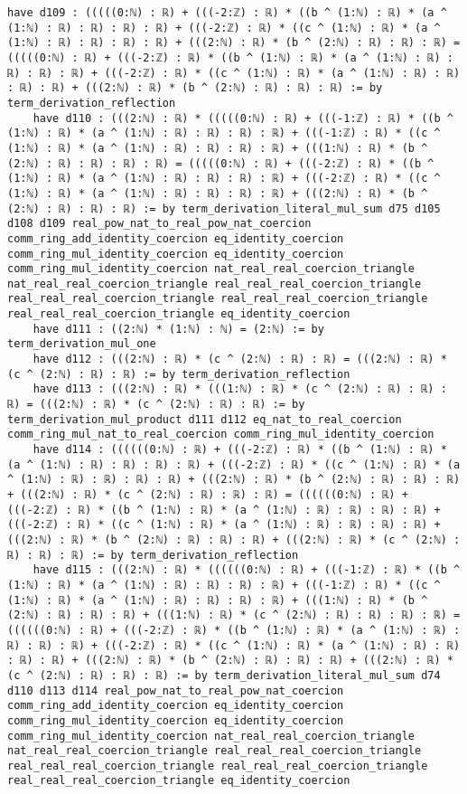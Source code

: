 \documentclass{article}
\begin{document}
\begin{tcolorbox}[colback=white!10, width=\linewidth]
\begin{lstlisting}[language=Lean4]
    have d109 : (((((0:ℕ) : ℝ) + (((-2:ℤ) : ℝ) * ((b ^ (1:ℕ) : ℝ) * (a ^ (1:ℕ) : ℝ) : ℝ) : ℝ) : ℝ) + (((-2:ℤ) : ℝ) * ((c ^ (1:ℕ) : ℝ) * (a ^ (1:ℕ) : ℝ) : ℝ) : ℝ) : ℝ) + (((2:ℕ) : ℝ) * (b ^ (2:ℕ) : ℝ) : ℝ) : ℝ) = (((((0:ℕ) : ℝ) + (((-2:ℤ) : ℝ) * ((b ^ (1:ℕ) : ℝ) * (a ^ (1:ℕ) : ℝ) : ℝ) : ℝ) : ℝ) + (((-2:ℤ) : ℝ) * ((c ^ (1:ℕ) : ℝ) * (a ^ (1:ℕ) : ℝ) : ℝ) : ℝ) : ℝ) + (((2:ℕ) : ℝ) * (b ^ (2:ℕ) : ℝ) : ℝ) : ℝ) := by term_derivation_reflection
    have d110 : (((2:ℕ) : ℝ) * (((((0:ℕ) : ℝ) + (((-1:ℤ) : ℝ) * ((b ^ (1:ℕ) : ℝ) * (a ^ (1:ℕ) : ℝ) : ℝ) : ℝ) : ℝ) + (((-1:ℤ) : ℝ) * ((c ^ (1:ℕ) : ℝ) * (a ^ (1:ℕ) : ℝ) : ℝ) : ℝ) : ℝ) + (((1:ℕ) : ℝ) * (b ^ (2:ℕ) : ℝ) : ℝ) : ℝ) : ℝ) = (((((0:ℕ) : ℝ) + (((-2:ℤ) : ℝ) * ((b ^ (1:ℕ) : ℝ) * (a ^ (1:ℕ) : ℝ) : ℝ) : ℝ) : ℝ) + (((-2:ℤ) : ℝ) * ((c ^ (1:ℕ) : ℝ) * (a ^ (1:ℕ) : ℝ) : ℝ) : ℝ) : ℝ) + (((2:ℕ) : ℝ) * (b ^ (2:ℕ) : ℝ) : ℝ) : ℝ) := by term_derivation_literal_mul_sum d75 d105 d108 d109 real_pow_nat_to_real_pow_nat_coercion comm_ring_add_identity_coercion eq_identity_coercion comm_ring_mul_identity_coercion eq_identity_coercion comm_ring_mul_identity_coercion nat_real_real_coercion_triangle nat_real_real_coercion_triangle real_real_real_coercion_triangle real_real_real_coercion_triangle real_real_real_coercion_triangle real_real_real_coercion_triangle eq_identity_coercion
    have d111 : ((2:ℕ) * (1:ℕ) : ℕ) = (2:ℕ) := by term_derivation_mul_one
    have d112 : (((2:ℕ) : ℝ) * (c ^ (2:ℕ) : ℝ) : ℝ) = (((2:ℕ) : ℝ) * (c ^ (2:ℕ) : ℝ) : ℝ) := by term_derivation_reflection
    have d113 : (((2:ℕ) : ℝ) * (((1:ℕ) : ℝ) * (c ^ (2:ℕ) : ℝ) : ℝ) : ℝ) = (((2:ℕ) : ℝ) * (c ^ (2:ℕ) : ℝ) : ℝ) := by term_derivation_mul_product d111 d112 eq_nat_to_real_coercion comm_ring_mul_nat_to_real_coercion comm_ring_mul_identity_coercion
    have d114 : ((((((0:ℕ) : ℝ) + (((-2:ℤ) : ℝ) * ((b ^ (1:ℕ) : ℝ) * (a ^ (1:ℕ) : ℝ) : ℝ) : ℝ) : ℝ) + (((-2:ℤ) : ℝ) * ((c ^ (1:ℕ) : ℝ) * (a ^ (1:ℕ) : ℝ) : ℝ) : ℝ) : ℝ) + (((2:ℕ) : ℝ) * (b ^ (2:ℕ) : ℝ) : ℝ) : ℝ) + (((2:ℕ) : ℝ) * (c ^ (2:ℕ) : ℝ) : ℝ) : ℝ) = ((((((0:ℕ) : ℝ) + (((-2:ℤ) : ℝ) * ((b ^ (1:ℕ) : ℝ) * (a ^ (1:ℕ) : ℝ) : ℝ) : ℝ) : ℝ) + (((-2:ℤ) : ℝ) * ((c ^ (1:ℕ) : ℝ) * (a ^ (1:ℕ) : ℝ) : ℝ) : ℝ) : ℝ) + (((2:ℕ) : ℝ) * (b ^ (2:ℕ) : ℝ) : ℝ) : ℝ) + (((2:ℕ) : ℝ) * (c ^ (2:ℕ) : ℝ) : ℝ) : ℝ) := by term_derivation_reflection
    have d115 : (((2:ℕ) : ℝ) * ((((((0:ℕ) : ℝ) + (((-1:ℤ) : ℝ) * ((b ^ (1:ℕ) : ℝ) * (a ^ (1:ℕ) : ℝ) : ℝ) : ℝ) : ℝ) + (((-1:ℤ) : ℝ) * ((c ^ (1:ℕ) : ℝ) * (a ^ (1:ℕ) : ℝ) : ℝ) : ℝ) : ℝ) + (((1:ℕ) : ℝ) * (b ^ (2:ℕ) : ℝ) : ℝ) : ℝ) + (((1:ℕ) : ℝ) * (c ^ (2:ℕ) : ℝ) : ℝ) : ℝ) : ℝ) = ((((((0:ℕ) : ℝ) + (((-2:ℤ) : ℝ) * ((b ^ (1:ℕ) : ℝ) * (a ^ (1:ℕ) : ℝ) : ℝ) : ℝ) : ℝ) + (((-2:ℤ) : ℝ) * ((c ^ (1:ℕ) : ℝ) * (a ^ (1:ℕ) : ℝ) : ℝ) : ℝ) : ℝ) + (((2:ℕ) : ℝ) * (b ^ (2:ℕ) : ℝ) : ℝ) : ℝ) + (((2:ℕ) : ℝ) * (c ^ (2:ℕ) : ℝ) : ℝ) : ℝ) := by term_derivation_literal_mul_sum d74 d110 d113 d114 real_pow_nat_to_real_pow_nat_coercion comm_ring_add_identity_coercion eq_identity_coercion comm_ring_mul_identity_coercion eq_identity_coercion comm_ring_mul_identity_coercion nat_real_real_coercion_triangle nat_real_real_coercion_triangle real_real_real_coercion_triangle real_real_real_coercion_triangle real_real_real_coercion_triangle real_real_real_coercion_triangle eq_identity_coercion

\end{lstlisting}
\end{tcolorbox}
\end{document}
